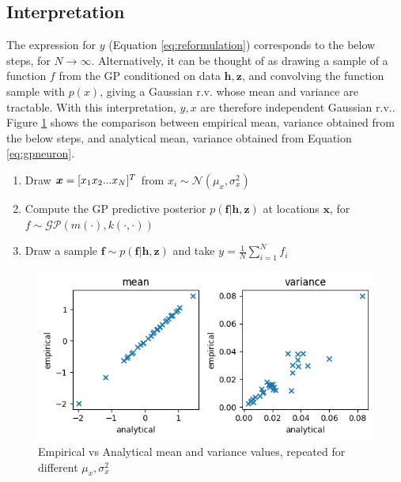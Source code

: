 \documentclass{article}
\begin{document}
\subsection{Interpretation}
The expression for $y$ (Equation \ref{eq:reformulation}) corresponds to the below steps, for $N\rightarrow \infty$. Alternatively, it can be thought of as drawing a sample of a function $f$ from the GP conditioned on data $\boldsymbol{h},\boldsymbol{z}$, and convolving the function sample with $p(x)$, giving a Gaussian r.v. whose mean and variance are tractable. With this interpretation, $y, x$ are therefore independent Gaussian r.v.. Figure \ref{fig:GP_sim} shows the comparison between empirical mean, variance obtained from the below steps, and analytical mean, variance obtained from Equation \ref{eq:gpneuron}.
\begin{enumerate}
    \item Draw $\boldsymbol{x}=[x_1\space x_2\space ... \space x_N]^T$ from $x_i\sim \mathcal{N}(\mu_x,\sigma_x^2)$
    \item Compute the GP predictive posterior $p(\boldsymbol{f}|\boldsymbol{h},\boldsymbol{z})$ at locations $\boldsymbol{x}$, for $f\sim\mathcal{GP}(m(\cdot),k(\cdot,\cdot))$
    \item Draw a sample $\boldsymbol{f}\sim p(\boldsymbol{f}|\boldsymbol{h},\boldsymbol{z})$ and take $y=\frac{1}{N}\sum_{i=1}^{N}f_i$
\end{enumerate}

\begin{figure}[t]
    \centering
    \includegraphics[width=0.6\columnwidth]{GP_neuron_sim.png}
    \caption{Empirical vs Analytical mean and variance values, repeated for different $\mu_x,\sigma_x^2$}
    \label{fig:GP_sim}
\end{figure}
\end{document}

